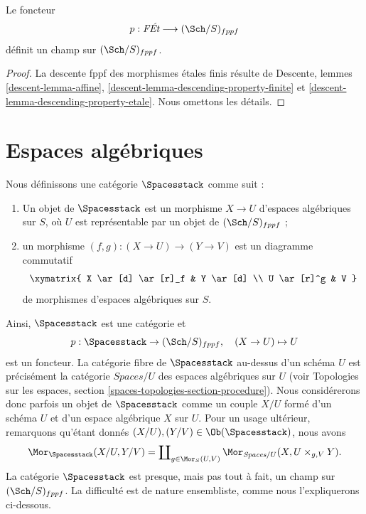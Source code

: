 \begin{lemma}
\label{lemma-finite-etale-stack}
Le foncteur
$$
p : \textit{F\'Et} \longrightarrow (\Sch/S)_{fppf}
$$
définit un champ sur $(\Sch/S)_{fppf}$.
\end{lemma}

\begin{proof}
La descente fppf des morphismes étales finis résulte de
Descente, lemmes \ref{descent-lemma-affine},
\ref{descent-lemma-descending-property-finite} et
\ref{descent-lemma-descending-property-etale}.
Nous omettons les détails.
\end{proof}






\section{Espaces algébriques}
\label{section-stack-of-spaces}

\noindent
Nous définissons une catégorie $\Spacesstack$ comme suit :
\begin{enumerate}
\item Un objet de $\Spacesstack$ est un morphisme $X \to U$
d'espaces algébriques sur $S$, où $U$ est représentable par un objet de
$(\Sch/S)_{fppf}$ ;
\item un morphisme $(f, g) : (X \to U) \to (Y \to V)$
est un diagramme commutatif
$$
\xymatrix{
X \ar[d] \ar[r]_f & Y \ar[d] \\
U \ar[r]^g & V
}
$$
de morphismes d'espaces algébriques sur $S$.
\end{enumerate}
Ainsi, $\Spacesstack$ est une catégorie et
$$
p : \Spacesstack \to (\Sch/S)_{fppf},
\quad
(X \to U) \mapsto U
$$
est un foncteur. La catégorie fibre de $\Spacesstack$ au-dessus
d'un schéma $U$ est précisément la catégorie $\textit{Spaces}/U$ des
espaces algébriques sur $U$ (voir
Topologies sur les espaces, section \ref{spaces-topologies-section-procedure}).
Nous considérerons donc parfois un objet de $\Spacesstack$ comme un
couple $X/U$ formé d'un schéma $U$ et d'un espace algébrique $X$ sur $U$.
Pour un usage ultérieur, remarquons qu'étant donnés
$(X/U), (Y/V) \in \Ob(\Spacesstack)$,
nous avons
\begin{equation}
\label{equation-morphisms-spaces}
\Mor_{\Spacesstack}(X/U, Y/V)
=
\coprod\nolimits_{g \in \Mor_S(U, V)}
\Mor_{\textit{Spaces}/U}(X, U \times_{g, V} Y).
\end{equation}
La catégorie $\Spacesstack$ est presque, mais pas tout à fait, un champ
sur $(\Sch/S)_{fppf}$. La difficulté est de nature ensembliste,
comme nous l'expliquerons ci-dessous.


